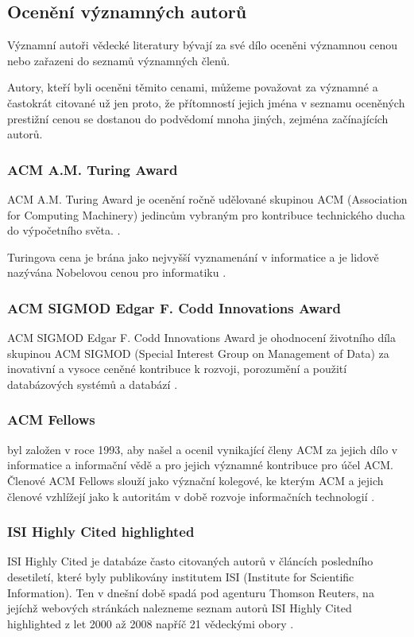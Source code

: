 \documentclass[12pt,titlepage]{report}
\begin{document}
\subsection{Ocenění významných autorů}
Významní autoři vědecké literatury bývají za své dílo oceněni významnou cenou
nebo zařazeni do seznamů významných členů.

Autory, kteří byli oceněni těmito cenami, můžeme považovat za významné a
častokrát citované už jen proto, že přítomností jejich jména v seznamu
oceněných prestižní cenou se dostanou do podvědomí mnoha jiných, zejména
začínajících autorů.

\subsubsection{ACM A.M. Turing Award}
ACM A.M. Turing Award je ocenění ročně udělované skupinou ACM (Association for
Computing Machinery) jedincům vybraným pro kontribuce technického ducha do
výpočetního světa.
\cite{turingaward}.

Turingova cena je brána jako nejvyšší vyznamenání v informatice a je lidově
nazývána Nobelovou cenou pro informatiku \cite[p.~317]{dasgupta}.

\subsubsection{ACM SIGMOD Edgar F. Codd Innovations Award}
ACM SIGMOD Edgar F. Codd Innovations Award je ohodnocení životního díla
skupinou ACM SIGMOD (Special Interest Group on Management of Data)  za
inovativní a vysoce ceněné kontribuce k rozvoji, porozumění a použití
databázových systémů a databází \cite{sigmodinnovations}.

\subsubsection{ACM Fellows}
 byl založen v roce 1993, aby našel a ocenil
vynikající členy ACM za jejich dílo v informatice a informační vědě a pro
jejich významné kontribuce pro účel ACM. Členové ACM Fellows slouží jako
význační kolegové, ke kterým ACM a jejich členové vzhlížejí jako k autoritám v
době rozvoje informačních technologií \cite{acmfellows}.

\subsubsection{ISI Highly Cited highlighted}
ISI Highly Cited je databáze často citovaných autorů v článcích posledního
desetiletí, které byly publikovány institutem ISI (Institute for Scientific
Information). Ten v dnešní době spadá pod agenturu Thomson Reuters, na jejíchž
webových stránkách nalezneme seznam autorů ISI Highly Cited highlighted z let
2000 až 2008 napříč 21 vědeckými obory \cite{highlycited}.
\end{document}
